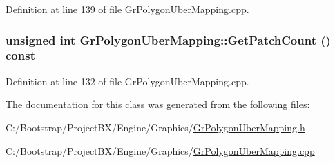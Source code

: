 Definition at line 139 of file GrPolygonUberMapping.cpp.\hypertarget{class_gr_polygon_uber_mapping_6ca0b2ef19243ef6fe5641e06b411297}{
\subsubsection[{GetPatchCount}]{\setlength{\rightskip}{0pt plus 5cm}unsigned int GrPolygonUberMapping::GetPatchCount () const}}
\label{class_gr_polygon_uber_mapping_6ca0b2ef19243ef6fe5641e06b411297}




Definition at line 132 of file GrPolygonUberMapping.cpp.

The documentation for this class was generated from the following files:\begin{CompactItemize}
\item 
C:/Bootstrap/ProjectBX/Engine/Graphics/\hyperlink{_gr_polygon_uber_mapping_8h}{GrPolygonUberMapping.h}\item 
C:/Bootstrap/ProjectBX/Engine/Graphics/\hyperlink{_gr_polygon_uber_mapping_8cpp}{GrPolygonUberMapping.cpp}\end{CompactItemize}
